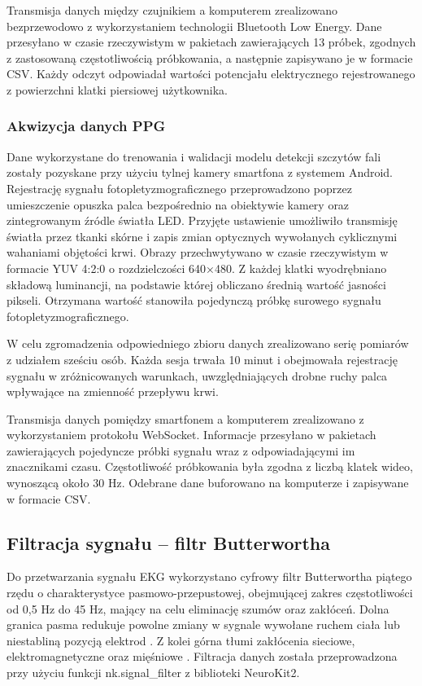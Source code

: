 \documentclass[journal]{IEEEtran}
\begin{document}
Transmisja danych między czujnikiem a komputerem zrealizowano bezprzewodowo z wykorzystaniem technologii Bluetooth Low Energy. Dane przesyłano w czasie rzeczywistym w pakietach zawierających 13 próbek, zgodnych z zastosowaną częstotliwością próbkowania, a następnie zapisywano je w formacie CSV. Każdy odczyt odpowiadał wartości potencjału elektrycznego rejestrowanego z powierzchni klatki piersiowej użytkownika.

\subsubsection{Akwizycja danych PPG}
Dane wykorzystane do trenowania i walidacji modelu detekcji szczytów fali zostały pozyskane przy użyciu tylnej kamery smartfona z systemem Android. Rejestrację sygnału fotopletyzmograficznego przeprowadzono poprzez umieszczenie opuszka palca bezpośrednio na obiektywie kamery oraz zintegrowanym źródle światła LED. Przyjęte ustawienie umożliwiło transmisję światła przez tkanki skórne i zapis zmian optycznych wywołanych cyklicznymi wahaniami objętości krwi. Obrazy przechwytywano w czasie rzeczywistym w formacie YUV 4:2:0 o rozdzielczości 640×480. Z każdej klatki wyodrębniano składową luminancji, na podstawie której obliczano średnią wartość jasności pikseli. Otrzymana wartość stanowiła pojedynczą próbkę surowego sygnału fotopletyzmograficznego.

W celu zgromadzenia odpowiedniego zbioru danych zrealizowano serię pomiarów z udziałem sześciu osób. Każda sesja trwała 10 minut i obejmowała rejestrację sygnału w zróżnicowanych warunkach, uwzględniających drobne ruchy palca wpływające na zmienność przepływu krwi.

Transmisja danych pomiędzy smartfonem a komputerem zrealizowano z wykorzystaniem protokołu WebSocket. Informacje przesyłano w pakietach zawierających pojedyncze próbki sygnału wraz z odpowiadającymi im znacznikami czasu. Częstotliwość próbkowania była zgodna z liczbą klatek wideo, wynoszącą około 30 Hz. Odebrane dane buforowano na komputerze i zapisywane w formacie CSV.

\subsection{Filtracja sygnału – filtr Butterwortha}
Do przetwarzania sygnału EKG wykorzystano cyfrowy filtr Butterwortha piątego rzędu o charakterystyce pasmowo-przepustowej, obejmującej zakres częstotliwości od 0,5 Hz do 45 Hz, mający na celu eliminację szumów oraz zakłóceń. Dolna granica pasma redukuje powolne zmiany w sygnale wywołane ruchem ciała lub niestabliną pozycją elektrod  \cite{7}. Z kolei górna tłumi zakłócenia sieciowe, elektromagnetyczne oraz mięśniowe  \cite{8}. Filtracja danych została przeprowadzona przy użyciu funkcji nk.signal\_filter z biblioteki NeuroKit2.
\end{document}
